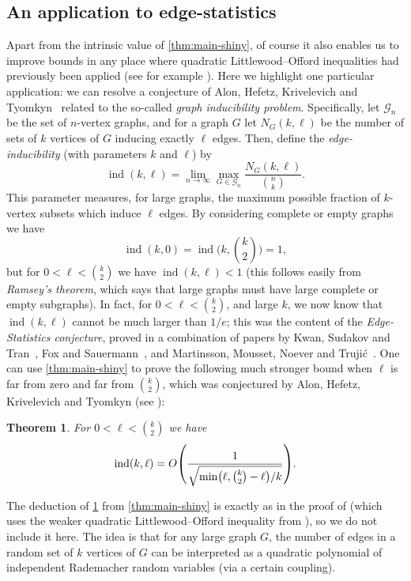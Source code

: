 \documentclass[english]{article}
\newtheorem{theorem}{Theorem}[section]
\theoremstyle{remark}
\numberwithin{equation}{section}
\numberwithin{figure}{section}
\newcommand{\on}{\operatorname}
\let\originalleft\left
\let\originalright\right
\renewcommand{\left}{\mathopen{}\mathclose\bgroup\originalleft}
\renewcommand{\right}{\aftergroup\egroup\originalright}
\begin{document}
\subsection{An application to edge-statistics}

Apart from the intrinsic value of \cref{thm:main-shiny}, of course it also enables us to improve bounds in any place where quadratic Littlewood--Offord inequalities had previously been applied (see for example \cite{AE14,CTV06,CV10,CV08,FKSS23,GKSS,KST19}).  Here we highlight one particular application: we can resolve a conjecture of Alon, Hefetz, Krivelevich and Tyomkyn~\cite{AHKT20} related to the so-called \emph{graph inducibility problem}. Specifically, let $\mathcal{G}_{n}$ be the set of $n$-vertex graphs, and for a graph $G$ let $N_{G}(k,\ell)$ be the number of sets of $k$ vertices of $G$ inducing exactly $\ell$ edges. Then, define the \emph{edge-inducibility} (with parameters $k$ and $\ell$) by
\[
\on{ind}(k,\ell)=\lim_{n\to\infty}\max_{G\in\mathcal{G}_{n}}\frac{N_{G}(k,\ell)}{\binom{n}{k}}.
\]
This parameter measures, for large graphs,
the maximum possible fraction of
$k$-vertex subsets which induce $\ell$ edges. By considering complete or empty graphs we have 
\[
\on{ind}(k,0)=\on{ind}\bigl(k,\textstyle{\binom{k}{2}}\bigr)=1,
\]
but for $0<\ell<\binom k 2$ we have $\on{ind}(k,\ell)<1$  (this follows easily from \emph{Ramsey's theorem}, which says that large graphs must have large complete or empty subgraphs). In fact,
for $0<\ell<\binom k 2$, and large $k$, we now know that $\on{ind}(k,\ell)$
cannot be much larger than $1/e$; this was the content of the \emph{Edge-Statistics conjecture}, 
proved in a combination of papers by Kwan, Sudakov and Tran~\cite{KST19},
Fox and Sauermann~\cite{FS20}, and Martinsson, Mousset, Noever and
Truji\'c~\cite{MMNT19}. One can use \cref{thm:main-shiny} to prove the following much stronger bound when $\ell$ is far from
zero and far from $\binom{k}{2}$, which was conjectured by Alon, Hefetz, Krivelevich and Tyomkyn (see \cite[Conjecture~6.2]{AHKT20}):
\begin{theorem}\label{thm:AHKT}
For $0<\ell<\binom k 2$ we have
\[\on{ind}(k,\ell)=O\left(\frac 1{\sqrt{\min\bigl(\ell,\binom k2-\ell\bigr)/k}}\right).\]
\end{theorem}
The deduction of \cref{thm:AHKT} from \cref{thm:main-shiny} is exactly as in the proof of \cite[Theorem~1.1]{KST19} (which uses the weaker quadratic Littlewood--Offord inequality from \cite{MNV16}), so we do not include it here. The idea is that for any large graph $G$, the number of edges in a random set of $k$ vertices of $G$ can be interpreted as a quadratic polynomial of independent Rademacher random variables (via a certain coupling).
\end{document}
